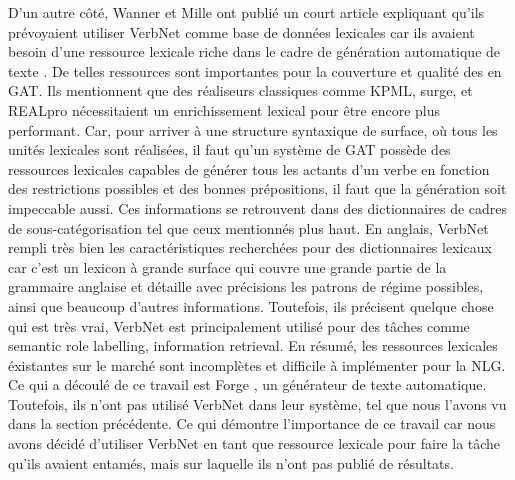 D'un autre côté, Wanner et Mille ont publié un court article expliquant qu'ils prévoyaient utiliser VerbNet comme base de données lexicales car ils avaient besoin d'une ressource lexicale riche dans le cadre de génération automatique de texte \citep{MilleLargeCoverageDetailed2015}. De telles ressources sont importantes pour la couverture et qualité des en GAT. Ils mentionnent que des réaliseurs classiques comme KPML, surge, et REALpro  nécessitaient un enrichissement lexical pour être encore plus performant. Car, pour arriver à une structure syntaxique de surface, où tous les unités lexicales sont réalisées, il faut qu'un système de GAT possède des ressources lexicales capables de générer tous les actants d'un verbe en fonction des restrictions possibles et des bonnes prépositions, il faut que la génération soit impeccable aussi. Ces informations se retrouvent dans des dictionnaires de cadres de sous-catégorisation tel que ceux mentionnés plus haut. En anglais, VerbNet rempli très bien les caractéristiques recherchées pour des dictionnaires lexicaux car c'est un lexicon à grande surface qui couvre une grande partie de la grammaire anglaise et détaille avec précisions les patrons de régime possibles, ainsi que beaucoup d'autres informations. Toutefois, ils précisent quelque chose qui est très vrai, VerbNet est principalement utilisé pour des tâches comme semantic role labelling, information retrieval. En résumé, les ressources lexicales éxistantes sur le marché sont incomplètes et difficile à implémenter pour la NLG. Ce qui a découlé de ce travail est Forge \citep{DBLP:conf/semeval/MilleCBW17}, un générateur de texte automatique. Toutefois, ils n'ont pas utilisé VerbNet dans leur système, tel que nous l'avons vu dans la section précédente. Ce qui démontre l'importance de ce travail car nous avons décidé d'utiliser VerbNet en tant que ressource lexicale pour faire la tâche qu'ils avaient entamés, mais sur laquelle ils n'ont pas publié de résultats.
